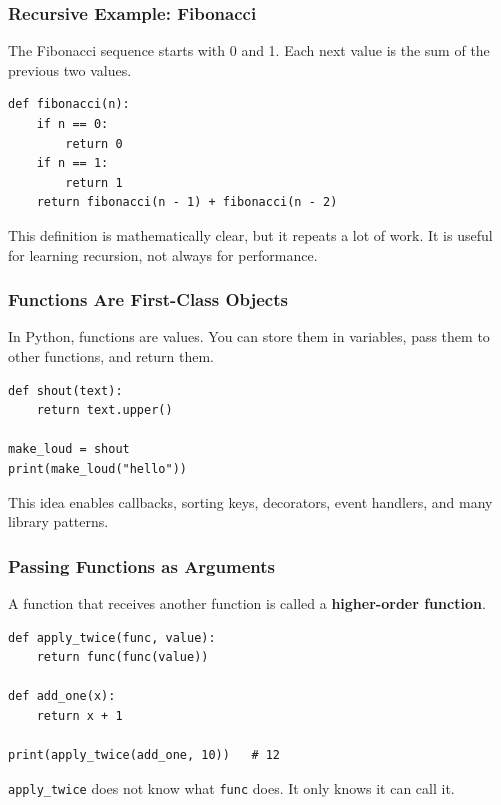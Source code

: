 \documentclass[aspectratio=169,10pt]{beamer}
\newcommand{\keyword}[1]{\textcolor{PrimaryBlue}{\textbf{#1}}}
\begin{document}
\begin{frame}[fragile]
\frametitle{Recursive Example: Fibonacci}
\small
The Fibonacci sequence starts with 0 and 1. Each next value is the sum of the previous two values.

\vspace{0.1cm}
\begin{lstlisting}[style=pycode]
def fibonacci(n):
    if n == 0:
        return 0
    if n == 1:
        return 1
    return fibonacci(n - 1) + fibonacci(n - 2)
\end{lstlisting}

\begin{tcolorbox}[lecturebox,title=Important lesson]
This definition is mathematically clear, but it repeats a lot of work. It is useful for learning recursion, not always for performance.
\end{tcolorbox}
\end{frame}

\begin{frame}[fragile]
\frametitle{Functions Are First-Class Objects}
\small
In Python, functions are values. You can store them in variables, pass them to other functions, and return them.

\vspace{0.1cm}
\begin{lstlisting}[style=pycode]
def shout(text):
    return text.upper()

make_loud = shout
print(make_loud("hello"))
\end{lstlisting}

\begin{tcolorbox}[lecturebox,title=Why this matters]
This idea enables callbacks, sorting keys, decorators, event handlers, and many library patterns.
\end{tcolorbox}
\end{frame}

\begin{frame}[fragile]
\frametitle{Passing Functions as Arguments}
\small
A function that receives another function is called a \keyword{higher-order function}.

\vspace{0.1cm}
\begin{lstlisting}[style=pycode]
def apply_twice(func, value):
    return func(func(value))

def add_one(x):
    return x + 1

print(apply_twice(add_one, 10))   # 12
\end{lstlisting}

\begin{tcolorbox}[lecturebox,title=Concept]
\texttt{apply\_twice} does not know what \texttt{func} does. It only knows it can call it.
\end{tcolorbox}
\end{frame}
\end{document}
